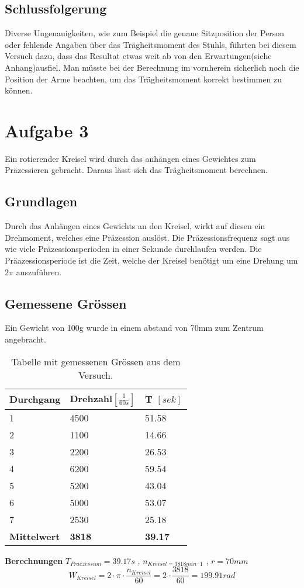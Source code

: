 \documentclass{article}
\begin{document}
\subsection{Schlussfolgerung}

Diverse Ungenauigkeiten, wie zum Beispiel die genaue Sitzposition der Person oder fehlende Angaben über das Trägheitsmoment des Stuhls, führten bei diesem Versuch dazu, dass das Resultat etwas weit ab von den Erwartungen(siehe Anhang)ausfiel. Man müsste bei der Berechnung im vornherein sicherlich noch die Position der Arme beachten, um das Trägheitsmoment korrekt bestimmen zu können.
\newpage
\section{Aufgabe 3}

Ein rotierender Kreisel wird durch das anhängen eines Gewichtes zum Präzessieren gebracht. Daraus lässt sich das Trägheitsmoment berechnen. 
\subsection{Grundlagen}
Durch das Anhängen eines Gewichts an den Kreisel, wirkt auf diesen ein Drehmoment, welches eine 
Präzession auslöst. Die Präzessionsfrequenz sagt aus wie viele Präzessionsperioden in einer Sekunde 
durchlaufen werden. Die Präazessionsperiode ist die Zeit, welche der Kreisel benötigt um eine Drehung um 2$\pi$ auszuführen.
\subsection{Gemessene Grössen}
Ein  Gewicht von 100g wurde in einem abstand von 70mm zum Zentrum angebracht.


\begin{table}[H]
   \center
    \begin{tabular}{|l|l|l|}
        \hline
        Durchgang & Drehzahl$[\frac{1}{60s}]$ & T $[sek]$    \\ \hline
        1         & 4500     & 51.58  \\ 
        2         & 1100     & 14.66 \\ 
        3         & 2200     & 26.53 \\ 
        4         & 6200     & 59.54 \\ 
        5         & 5200     & 43.04 \\ 
        6         & 5000     & 53.07\\ 
        7         & 2530     & 25.18  \\ \hline
        \textbf{Mittelwert}&\textbf{3818}&\textbf{39.17}\\
        \hline
    \end{tabular}
    \caption{Tabelle mit gemessenen Grössen aus dem Versuch.}
\end{table}
\textbf{Berechnungen}
$T_{Praezession} = 39.17s$ ,
$n_{Kreisel=3818min^-1}$ ,
$r=70mm$\\
\begin{equation}
W_{Kreisel}=2 \cdot \pi	\cdot \frac{n_{Kreisel}}{60}=2 \cdot \frac{3818}{60}= \underline{199.91}rad
\end{equation}
\end{document}
